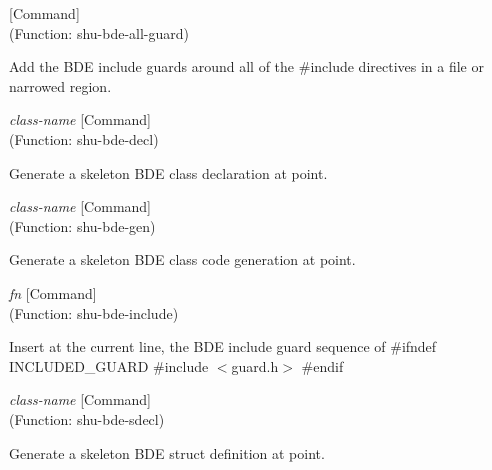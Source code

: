 \vspace{1em}
\noindent
{}
\usebox{\funcname}
 \hfill [Command]\\%
 (Function: shu-bde-all-guard)

\begin{doc-string}
Add the BDE include guards around all of the \#include directives in a file
or narrowed region.
\end{doc-string}

\vspace{1em}
\noindent
{}
\usebox{\funcname}\emph{class-name}
 \hfill [Command]\\%
 (Function: shu-bde-decl)

\begin{doc-string}
Generate a skeleton BDE class declaration at point.
\end{doc-string}

\vspace{1em}
\noindent
{}
\usebox{\funcname}\emph{class-name}
 \hfill [Command]\\%
 (Function: shu-bde-gen)

\begin{doc-string}
Generate a skeleton BDE class code generation at point.
\end{doc-string}

\vspace{1em}
\noindent
{}
\usebox{\funcname}\emph{fn}
 \hfill [Command]\\%
 (Function: shu-bde-include)

\begin{doc-string}
Insert at the current line, the BDE include guard sequence of
\#ifndef INCLUDED\_GUARD
\#include $<$guard.h$>$
\#endif
\end{doc-string}

\vspace{1em}
\noindent
{}
\usebox{\funcname}\emph{class-name}
 \hfill [Command]\\%
 (Function: shu-bde-sdecl)

\begin{doc-string}
Generate a skeleton BDE struct definition at point.
\end{doc-string}

